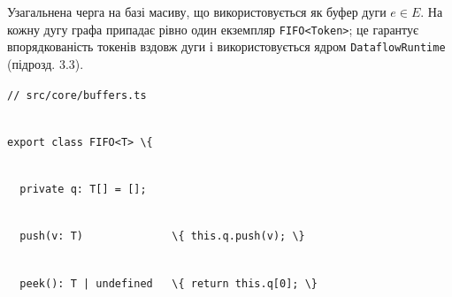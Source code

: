 \documentclass[
]{article}
\newcommand{\passthrough}[1]{#1}
\begin{document}
Узагальнена черга на базі масиву, що використовується як буфер дуги
\(e \in E\). На кожну дугу графа припадає рівно один екземпляр
\passthrough{\lstinline!FIFO!}\passthrough{\lstinline!<!}\passthrough{\lstinline!Token!}\passthrough{\lstinline!>!};
це гарантує впорядкованість токенів вздовж дуги і використовується ядром
\passthrough{\lstinline!DataflowRuntime!} (підрозд. 3.3).

\passthrough{\lstinline!//!}\passthrough{\lstinline! !}\passthrough{\lstinline!src!}\passthrough{\lstinline!/!}\passthrough{\lstinline!core!}\passthrough{\lstinline!/!}\passthrough{\lstinline!buffers!}\passthrough{\lstinline!.!}\passthrough{\lstinline!ts!}\strut \\
\passthrough{\lstinline!export!}\passthrough{\lstinline! !}\passthrough{\lstinline!class!}\passthrough{\lstinline! !}\passthrough{\lstinline!FIFO!}\passthrough{\lstinline!<!}\passthrough{\lstinline!T!}\passthrough{\lstinline!>!}\passthrough{\lstinline! !}\passthrough{\lstinline!\{!}\strut \\
\passthrough{\lstinline!  !}\passthrough{\lstinline!private!}\passthrough{\lstinline! !}\passthrough{\lstinline!q!}\passthrough{\lstinline!:!}\passthrough{\lstinline! !}\passthrough{\lstinline!T!}\passthrough{\lstinline![]!}\passthrough{\lstinline! !}\passthrough{\lstinline!=!}\passthrough{\lstinline! !}\passthrough{\lstinline![];!}\strut \\
\passthrough{\lstinline!  !}\passthrough{\lstinline!push!}\passthrough{\lstinline!(!}\passthrough{\lstinline!v!}\passthrough{\lstinline!:!}\passthrough{\lstinline! !}\passthrough{\lstinline!T!}\passthrough{\lstinline!)!}\passthrough{\lstinline!              !}\passthrough{\lstinline!\{!}\passthrough{\lstinline! !}\passthrough{\lstinline!this!}\passthrough{\lstinline!.!}\passthrough{\lstinline!q!}\passthrough{\lstinline!.!}\passthrough{\lstinline!push!}\passthrough{\lstinline!(!}\passthrough{\lstinline!v!}\passthrough{\lstinline!);!}\passthrough{\lstinline! !}\passthrough{\lstinline!\}!}\strut \\
\passthrough{\lstinline!  !}\passthrough{\lstinline!peek!}\passthrough{\lstinline!():!}\passthrough{\lstinline! !}\passthrough{\lstinline!T!}\passthrough{\lstinline! !}\passthrough{\lstinline!|!}\passthrough{\lstinline! !}\passthrough{\lstinline!undefined!}\passthrough{\lstinline!   !}\passthrough{\lstinline!\{!}\passthrough{\lstinline! !}\passthrough{\lstinline!return!}\passthrough{\lstinline! !}\passthrough{\lstinline!this!}\passthrough{\lstinline!.!}\passthrough{\lstinline!q!}\passthrough{\lstinline![0];!}\passthrough{\lstinline! !}\passthrough{\lstinline!\}!}\strut \\
\end{document}

